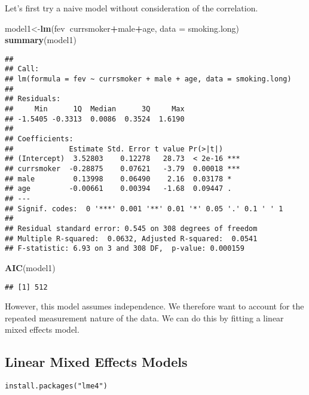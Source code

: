 \documentclass[]{book}
\newenvironment{Shaded}{\begin{snugshade}}{\end{snugshade}}
\newcommand{\KeywordTok}[1]{\textcolor[rgb]{0.13,0.29,0.53}{\textbf{#1}}}
\newcommand{\DataTypeTok}[1]{\textcolor[rgb]{0.13,0.29,0.53}{#1}}
\newcommand{\OperatorTok}[1]{\textcolor[rgb]{0.81,0.36,0.00}{\textbf{#1}}}
\newcommand{\NormalTok}[1]{#1}
\theoremstyle{definition}
\theoremstyle{definition}
\theoremstyle{definition}
\theoremstyle{remark}
\begin{document}
Let's first try a naive model without consideration of the correlation.

\begin{Shaded}
\begin{Highlighting}[]
\NormalTok{model1<-}\KeywordTok{lm}\NormalTok{(fev}\OperatorTok{~}\NormalTok{currsmoker}\OperatorTok{+}\NormalTok{male}\OperatorTok{+}\NormalTok{age, }\DataTypeTok{data =}\NormalTok{ smoking.long) }
\KeywordTok{summary}\NormalTok{(model1)}
\end{Highlighting}
\end{Shaded}

\begin{verbatim}
## 
## Call:
## lm(formula = fev ~ currsmoker + male + age, data = smoking.long)
## 
## Residuals:
##     Min      1Q  Median      3Q     Max 
## -1.5405 -0.3313  0.0086  0.3524  1.6190 
## 
## Coefficients:
##             Estimate Std. Error t value Pr(>|t|)    
## (Intercept)  3.52803    0.12278   28.73  < 2e-16 ***
## currsmoker  -0.28875    0.07621   -3.79  0.00018 ***
## male         0.13998    0.06490    2.16  0.03178 *  
## age         -0.00661    0.00394   -1.68  0.09447 .  
## ---
## Signif. codes:  0 '***' 0.001 '**' 0.01 '*' 0.05 '.' 0.1 ' ' 1
## 
## Residual standard error: 0.545 on 308 degrees of freedom
## Multiple R-squared:  0.0632, Adjusted R-squared:  0.0541 
## F-statistic: 6.93 on 3 and 308 DF,  p-value: 0.000159
\end{verbatim}

\begin{Shaded}
\begin{Highlighting}[]
\KeywordTok{AIC}\NormalTok{(model1)}
\end{Highlighting}
\end{Shaded}

\begin{verbatim}
## [1] 512
\end{verbatim}

However, this model assumes independence. We therefore want to account
for the repeated measurement nature of the data. We can do this by
fitting a linear mixed effects model.

\subsection{Linear Mixed Effects
Models}\label{linear-mixed-effects-models}

\begin{verbatim}
install.packages("lme4")
\end{verbatim}
\end{document}
